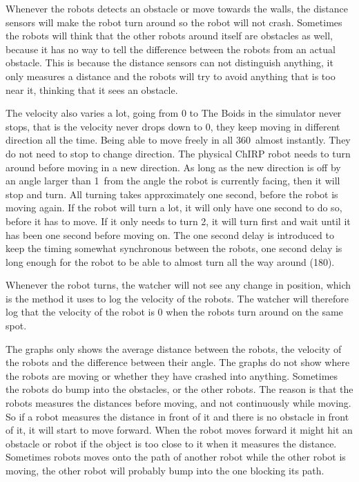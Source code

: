 Whenever the robots detects an obstacle or move towards the walls, the distance sensors will make the robot turn around so the robot will not crash. Sometimes the robots will think that the other robots around itself are obstacles as well, because it has no way to tell the difference between the robots from an actual obstacle. This is because the distance sensors can not distinguish anything, it only measures a distance and the robots will try to avoid anything that is too near it, thinking that it sees an obstacle.

The velocity also varies a lot, going from 0 to %
The Boids in the simulator never stops, that is the velocity never drops down to 0, they keep moving in different direction all the time. Being able to move freely in all 360\textdegree\ almost instantly. They do not need to stop to change direction.
The physical ChIRP robot needs to turn around before moving in a new direction. As long as the new direction is off by an angle larger than 1\textdegree\ from the angle the robot is currently facing, then it will stop and turn. All turning takes approximately one second, before the robot is moving again. If the robot will turn a lot, it will only have one second to do so, before it has to move. If it only needs to turn 2\textdegree, it will turn first and wait until it has been one second before moving on.
The one second delay is introduced to keep the timing somewhat synchronous between the robots, one second delay is long enough for the robot to be able to almost turn all the way around (180\textdegree). 

Whenever the robot turns, the watcher will not see any change in position, which is the method it uses to log the velocity of the robots. The watcher will therefore log that the velocity of the robot is 0 when the robots turn around on the same spot. 

The graphs only shows the average distance between the robots, the velocity of the robots and the difference between their angle. The graphs do not show where the robots are moving or whether they have crashed into anything.
Sometimes the robots do bump into the obstacles, or the other robots. The reason is that the robots measures the distances before moving, and not continuously while moving. So if a robot measures the distance in front of it and there is no obstacle in front of it, it will start to move forward. When the robot moves forward it might hit an obstacle or robot if the object is too close to it when it measures the distance. Sometimes robots moves onto the path of another robot while the other robot is moving, the other robot will probably bump into the one blocking its path. 

